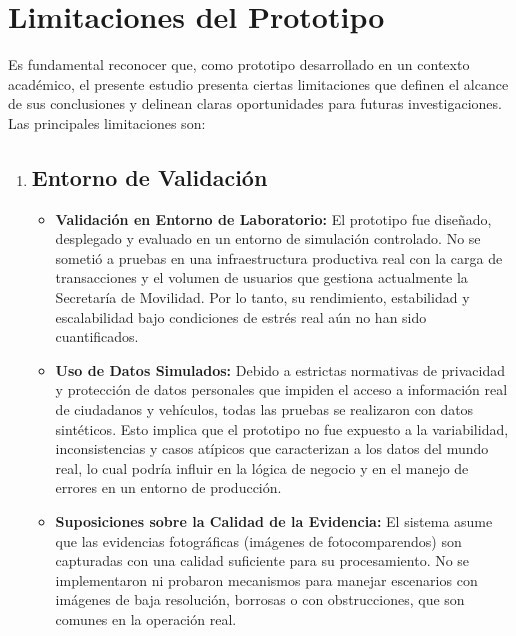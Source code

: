 \section{Limitaciones del Prototipo}
Es fundamental reconocer que, como prototipo desarrollado en un contexto académico, el presente estudio presenta ciertas limitaciones que definen el alcance de sus conclusiones y delinean claras oportunidades para futuras investigaciones. Las principales limitaciones son:

\begin{enumerate}
    \item \subsection{Entorno de Validación}
    \begin{itemize}
        \item \textbf{Validación en Entorno de Laboratorio:} El prototipo fue diseñado, desplegado y evaluado en un entorno de simulación controlado. No se sometió a pruebas en una infraestructura productiva real con la carga de transacciones y el volumen de usuarios que gestiona actualmente la Secretaría de Movilidad. Por lo tanto, su rendimiento, estabilidad y escalabilidad bajo condiciones de estrés real aún no han sido cuantificados.
        \item \textbf{Uso de Datos Simulados:} Debido a estrictas normativas de privacidad y protección de datos personales que impiden el acceso a información real de ciudadanos y vehículos, todas las pruebas se realizaron con datos sintéticos. Esto implica que el prototipo no fue expuesto a la variabilidad, inconsistencias y casos atípicos que caracterizan a los datos del mundo real, lo cual podría influir en la lógica de negocio y en el manejo de errores en un entorno de producción.
        \item \textbf{Suposiciones sobre la Calidad de la Evidencia:} El sistema asume que las evidencias fotográficas (imágenes de fotocomparendos) son capturadas con una calidad suficiente para su procesamiento. No se implementaron ni probaron mecanismos para manejar escenarios con imágenes de baja resolución, borrosas o con obstrucciones, que son comunes en la operación real.
    \end{itemize}


\end{enumerate}
